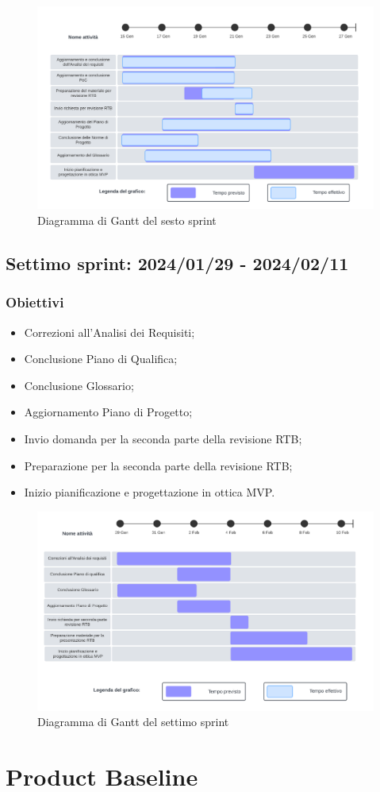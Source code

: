\begin{figure}[h!]
    \centering  
    \includegraphics[width=\textwidth]{Roadmap6sprint.png}
    \caption{Diagramma di Gantt del sesto sprint}
    \label{fig:roadmap6s}
\end{figure}
\newpage

\subsection{Settimo sprint: 2024/01/29 - 2024/02/11}
\subsubsection{Obiettivi}
\begin{itemize}
    \item Correzioni all'Analisi dei Requisiti;
    \item Conclusione Piano di Qualifica;
    \item Conclusione Glossario;
    \item Aggiornamento Piano di Progetto;
    \item Invio domanda per la seconda parte della revisione RTB;
    \item Preparazione per la seconda parte della revisione RTB;
    \item Inizio pianificazione e progettazione in ottica MVP.
\end{itemize}

\begin{figure}[h!]
    \centering  
    \includegraphics[width=\textwidth]{Roadmap7sprint.png}
    \caption{Diagramma di Gantt del settimo sprint}
    \label{fig:roadmap7s}
\end{figure}
\newpage

\section{Product Baseline}
